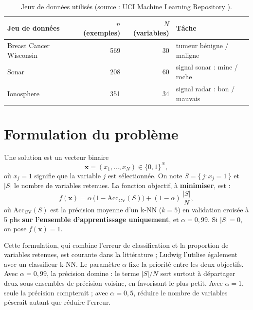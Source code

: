 \documentclass[11pt,a4paper]{report}
\begin{document}
\begin{table}[H]
\centering
\caption{Jeux de données utilisés (source : UCI Machine Learning Repository \cite{uci}).}
\label{tab:datasets}
\begin{tabular}{@{}lrrl@{}}
\toprule
Jeu de données & $n$ (exemples) & $N$ (variables) & Tâche \\
\midrule
Breast Cancer Wisconsin & 569 & 30 & tumeur bénigne / maligne \\
Sonar                   & 208 & 60 & signal sonar : mine / roche \\
Ionosphere              & 351 & 34 & signal radar : bon / mauvais \\
\bottomrule
\end{tabular}
\end{table}

\section{Formulation du problème}
\label{sec:formulation}
Une solution est un vecteur binaire
\[
\mathbf{x} = (x_1, \dots, x_N) \in \{0,1\}^N,
\]
où $x_j = 1$ signifie que la variable $j$ est sélectionnée. On note
$S = \{\, j : x_j = 1 \,\}$ et $|S|$ le nombre de variables retenues. La fonction objectif, à
\textbf{minimiser}, est :
\begin{equation}
f(\mathbf{x}) = \alpha \,\bigl(1 - \mathrm{Acc}_{\mathrm{CV}}(S)\bigr)
              + (1-\alpha)\,\frac{|S|}{N},
\label{eq:fitness}
\end{equation}
où $\mathrm{Acc}_{\mathrm{CV}}(S)$ est la précision moyenne d'un k-NN ($k=5$) en validation
croisée à 5 plis \textbf{sur l'ensemble d'apprentissage uniquement}, et $\alpha = 0{,}99$.
Si $|S| = 0$, on pose $f(\mathbf{x}) = 1$.

Cette formulation, qui combine l'erreur de classification et la proportion de variables
retenues, est courante dans la littérature ; Ludwig \cite{ludwig2025} l'utilise également avec un
classifieur k-NN. Le paramètre $\alpha$ fixe la priorité entre les deux objectifs. Avec $\alpha = 0{,}99$, la
précision domine : le terme $|S|/N$ sert surtout à départager deux sous-ensembles de précision
voisine, en favorisant le plus petit. Avec $\alpha = 1$, seule la précision compterait ; avec
$\alpha = 0{,}5$, réduire le nombre de variables pèserait autant que réduire l'erreur.

\end{document}
